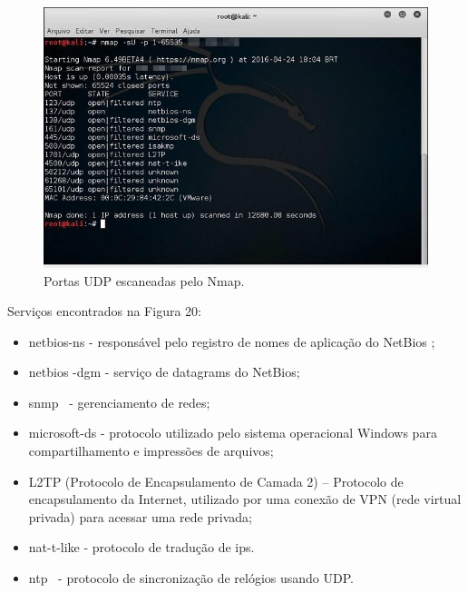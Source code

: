 \documentclass[
    12pt,               %
    openright,          %
    oneside,            %
    a4paper,            %
    section=TITLE,     %
    english,            %
    french,             %
    spanish,            %
    brazil              %
    ]{abntex2}
\newcommand{\citep}{\cite}
\begin{document}
\begin{figure}[htp]
\centering
\caption{Portas UDP escaneadas pelo Nmap.}
\includegraphics[width=450px]{image16.jpeg}
\end{figure}
\ifdefined\FloatBarrier \FloatBarrier \fi


Serviços encontrados na Figura 20:



\begin{itemize}
	
\item netbios-ns - responsável pelo registro de nomes de aplicação do NetBios \citep{62208};
	
\item netbios -dgm - serviço de datagrams do NetBios;
	
\item snmp~\citep{62209} - gerenciamento de redes;
	
\item microsoft-ds - protocolo utilizado pelo sistema operacional Windows para compartilhamento e impressões de arquivos;
	
\item L2TP (Protocolo de Encapsulamento de Camada 2) \citep{62215}-- Protocolo de encapsulamento da Internet, utilizado por uma conexão de VPN (rede virtual privada) para acessar uma rede privada;
	
\item nat-t-like - protocolo de tradução de ips.
	
\item ntp \citep{62207}~- protocolo de sincronização de relógios usando UDP.

\end{itemize}

~
\end{document}
